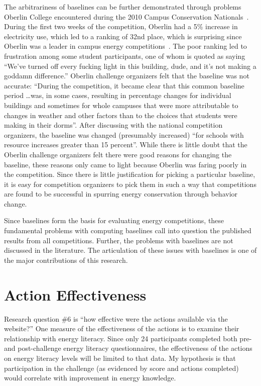 The arbitrariness of baselines can be further demonstrated through problems Oberlin College encountered during the 2010 Campus Conservation Nationals~\cite{Willens2010}. During the first two weeks of the competition, Oberlin had a 5\% increase in electricity use, which led to a ranking of 32nd place, which is surprising since Oberlin was a leader in campus energy competitions~\cite{petersen-dorm-energy-reduction}. The poor ranking led to frustration among some student participants, one of whom is quoted as saying ``We've turned off every fucking light in this building, dude, and it's not making a goddamn difference.'' Oberlin challenge organizers felt that the baseline was not accurate: ``During the competition, it became clear that this common baseline period \ldots was, in some cases, resulting in percentage changes for individual buildings and sometimes for whole campuses that were more attributable to changes in weather and other factors than to the choices that students were making in their dorms''. After discussing with the national competition organizers, the baseline was changed (presumably increased) ``for schools with resource increases greater than 15 percent''. While there is little doubt that the Oberlin challenge organizers felt there were good reasons for changing the baseline, these reasons only came to light because Oberlin was faring poorly in the competition. Since there is little justification for picking a particular baseline, it is easy for competition organizers to pick them in such a way that competitions are found to be successful in spurring energy conservation through behavior change.

Since baselines form the basis for evaluating energy competitions, these fundamental problems with computing baselines call into question the published results from all competitions. Further, the problems with baselines are not discussed in the literature. The articulation of these issues with baselines is one of the major contributions of this research.


\section{Action Effectiveness}

Research question \#6 is ``how effective were the actions available via the website?'' One measure of the effectiveness of the actions is to examine their relationship with energy literacy. Since only 24 participants completed both pre- and post-challenge energy literacy questionnaires, the effectiveness of the actions on energy literacy levels will be limited to that data. My hypothesis is that participation in the challenge (as evidenced by score and actions completed) would correlate with improvement in energy knowledge.

